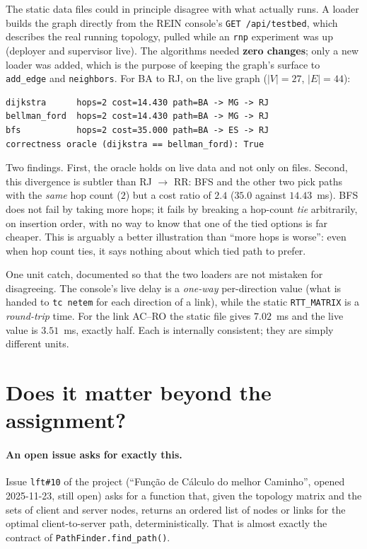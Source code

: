 \documentclass[11pt,a4paper]{article}
\begin{document}
The static data files could in principle disagree with what actually runs. A loader builds the graph directly from the
REIN console's \texttt{GET /api/testbed}, which describes the real running topology, pulled while an \texttt{rnp}
experiment was up (deployer and supervisor live). The algorithms needed \textbf{zero changes}; only a new loader
was added, which is the purpose of keeping the graph's surface to \texttt{add\_edge} and \texttt{neighbors}.
For BA to RJ, on the live graph ($|V|=27$, $|E|=44$):

\begin{lstlisting}[language={}, caption={Live-graph query BA to RJ (live testbed, RNP experiment).}, label={lst:live}]
dijkstra      hops=2 cost=14.430 path=BA -> MG -> RJ
bellman_ford  hops=2 cost=14.430 path=BA -> MG -> RJ
bfs           hops=2 cost=35.000 path=BA -> ES -> RJ
correctness oracle (dijkstra == bellman_ford): True
\end{lstlisting}

Two findings. First, the oracle holds on live data and not only on files. Second, this divergence is subtler than
RJ $\to$ RR: BFS and the other two pick paths with the \emph{same} hop count ($2$) but a cost ratio of $2.4$
($35.0$ against $14.43$~ms). BFS does not fail by taking more hops; it fails by breaking a hop-count \emph{tie}
arbitrarily, on insertion order, with no way to know that one of the tied options is far cheaper. This is arguably a
better illustration than ``more hops is worse'': even when hop count ties, it says nothing about which tied path to prefer.

One unit catch, documented so that the two loaders are not mistaken for disagreeing. The console's live delay is a
\emph{one-way} per-direction value (what is handed to \texttt{tc netem} for each direction of a link), while the static
\texttt{RTT\_MATRIX} is a \emph{round-trip} time. For the link AC--RO the static file gives $7.02$~ms and the live value is
$3.51$~ms, exactly half. Each is internally consistent; they are simply different units.

\section{Does it matter beyond the assignment?}
\label{sec:relevance}

\paragraph{An open issue asks for exactly this.}
Issue \texttt{lft\#10} of the project (``Função de Cálculo do melhor Caminho'', opened 2025-11-23, still open) asks for a function
that, given the topology matrix and the sets of client and server nodes, returns an ordered list of nodes or links for the
optimal client-to-server path, deterministically. That is almost exactly the contract of \texttt{PathFinder.find\_path()}.
\end{document}
